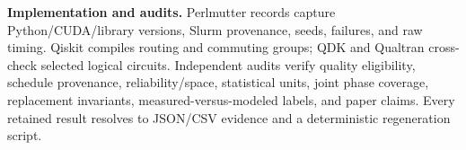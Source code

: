 \noindent\textbf{Implementation and audits.}
Perlmutter records capture Python/CUDA/library versions, Slurm provenance, seeds, failures, and raw timing. Qiskit compiles routing and commuting groups; QDK and Qualtran cross-check selected logical circuits. Independent audits verify quality eligibility, schedule provenance, reliability/space, statistical units, joint phase coverage, replacement invariants, measured-versus-modeled labels, and paper claims. Every retained result resolves to JSON/CSV evidence and a deterministic regeneration script.
